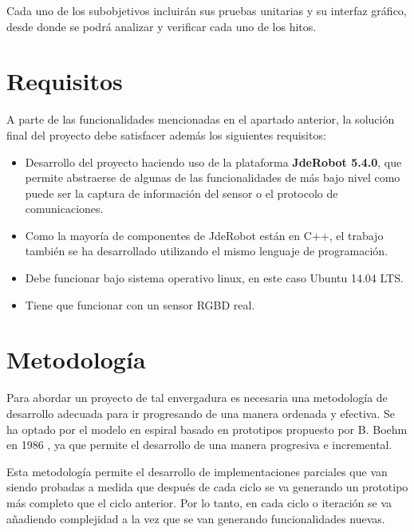 Cada uno de los subobjetivos incluirán sus pruebas unitarias y su interfaz gráfico, desde donde se podrá analizar y verificar cada uno de los hitos.

\section{Requisitos}

A parte de las funcionalidades mencionadas en el apartado anterior, la solución final del proyecto debe satisfacer además los siguientes requisitos:

\begin{itemize}

\item Desarrollo del proyecto haciendo uso de la plataforma \textbf{JdeRobot 5.4.0}, que permite abstraerse de algunas de las funcionalidades de más bajo nivel como puede ser la captura de información del sensor o el protocolo de comunicaciones.

\item Como la mayoría de componentes de JdeRobot están en C++, el trabajo también se ha desarrollado utilizando el mismo lenguaje de programación.

\item Debe funcionar bajo sistema operativo linux, en este caso Ubuntu 14.04 LTS.

\item Tiene que funcionar con un sensor RGBD real.

\end{itemize}


\section{Metodología}

Para abordar un proyecto de tal envergadura es necesaria una metodología de desarrollo adecuada para ir progresando de una manera ordenada y efectiva. Se ha optado por el modelo en espiral basado en prototipos propuesto por B. Boehm en 1986 \parencite{Reference7}, ya que permite el desarrollo de una manera progresiva e incremental. 

Esta metodología permite el desarrollo de implementaciones parciales que van siendo probadas a medida que después de cada ciclo se va generando un prototipo más completo que el ciclo anterior. Por lo tanto, en cada ciclo o iteración se va añadiendo complejidad a la vez que se van generando funcionalidades nuevas.

